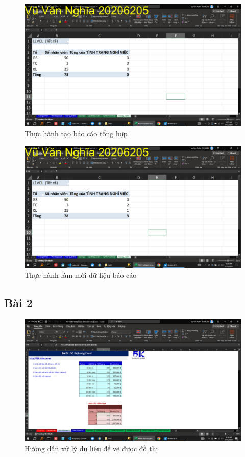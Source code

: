 \documentclass{article}
\begin{document}
\begin{figure}[H]
    \centering
    \includegraphics[scale = 0.15]{Bai1/ThucHanh/1.png}
    \caption{Thực hành tạo báo cáo tổng hợp}
\end{figure}



\begin{figure}[H]
    \centering
    \includegraphics[scale = 0.15]{Bai1/ThucHanh/2.png}
    \caption{Thực hành làm mới dữ liệu báo cáo}
\end{figure}




\subsection{Bài 2}

\begin{figure}[H]
    \centering
    \includegraphics[scale = 0.15]{Bai2/HuongDan/0.png}
    \caption{Hướng dẫn xử lý dữ liệu để vẽ được đồ thị}
\end{figure}
\end{document}

